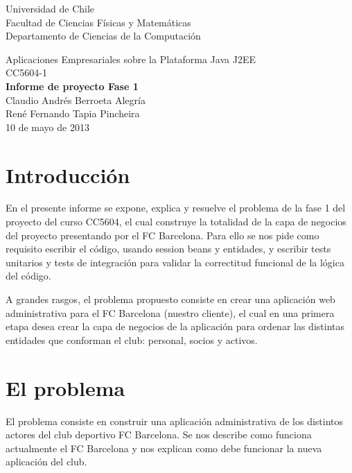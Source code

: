 \documentclass[letter]{article}
\begin{document}

\thispagestyle{empty}
\begin{flushleft}
  Universidad de Chile\\Facultad de Ciencias Físicas y Matemáticas\\Departamento de Ciencias de la Computación\\[4cm]
\end{flushleft}
\begin{center}
  \huge{Aplicaciones Empresariales sobre la Plataforma Java J2EE\\[1.5cm] CC5604-1\\[0.4cm]}
  \Large{\textbf{Informe de proyecto Fase 1\\[2.5cm]}Claudio Andrés Berroeta Alegría\\[0.4cm]René Fernando Tapia Pincheira\\[2.5cm]10 de mayo de 2013}
\end{center}


\newpage
\tableofcontents


\newpage
\section{Introducción}

En el presente informe se expone, explica y resuelve el problema de la fase 1 del proyecto del curso CC5604, el cual construye la totalidad de la capa de negocios del proyecto presentando por el FC Barcelona. Para ello se nos pide como requisito escribir el código, usando session beans y entidades, y escribir tests unitarios y tests de integración para validar la correctitud funcional de la lógica del código.

A grandes rasgos, el problema propuesto consiste en crear una aplicación web administrativa para el FC Barcelona (nuestro cliente), el cual en una primera etapa desea crear la capa de negocios de la aplicación para ordenar las distintas entidades que conforman el club: personal, socios y activos.

\newpage
\section{El problema}

El problema consiste en construir una aplicación administrativa de los distintos actores del club deportivo FC Barcelona. Se nos describe como funciona actualmente el FC Barcelona y nos explican como debe funcionar la nueva aplicación del club.
\end{document}
